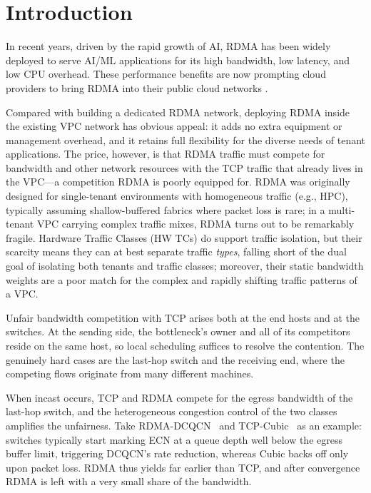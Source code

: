 
\section{Introduction}
\label{sec:intro}

In recent years, driven by the rapid growth of AI, RDMA has been widely
deployed to serve AI/ML applications for its high bandwidth, low latency,
and low CPU overhead. These performance benefits are now prompting cloud
providers to bring RDMA into their public cloud networks
\cite{azure-rdma,alibaba-erdma}.

Compared with building a dedicated RDMA network, deploying RDMA inside
the existing VPC network has obvious appeal: it adds no extra equipment
or management overhead, and it retains full flexibility for the diverse
needs of tenant applications. The price, however, is that RDMA traffic
must compete for bandwidth and other network resources with the TCP
traffic that already lives in the VPC---a competition RDMA is poorly
equipped for. RDMA was originally designed for single-tenant
environments with homogeneous traffic (e.g., HPC), typically assuming
shallow-buffered fabrics where packet loss is rare; in a multi-tenant
VPC carrying complex traffic mixes, RDMA turns out to be remarkably
fragile. Hardware Traffic Classes (HW TCs) do support traffic isolation,
but their scarcity means they can at best separate traffic
\emph{types}, falling short of the dual goal of isolating both tenants
and traffic classes; moreover, their static bandwidth weights are a poor
match for the complex and rapidly shifting traffic patterns of a VPC.

Unfair bandwidth competition with TCP arises both at the end hosts and
at the switches. At the sending side, the bottleneck's owner and all of
its competitors reside on the same host, so local scheduling suffices to
resolve the contention. The genuinely hard cases are the last-hop switch
and the receiving end, where the competing flows originate from many
different machines.

When incast occurs, TCP and RDMA compete for the egress bandwidth of the
last-hop switch, and the heterogeneous congestion control of the two
classes amplifies the unfairness. Take RDMA-DCQCN~\cite{dcqcn} and
TCP-Cubic~\cite{cubic} as an example: switches typically start marking
ECN at a queue depth well below the egress buffer limit, triggering
DCQCN's rate reduction, whereas Cubic backs off only upon packet loss.
RDMA thus yields far earlier than TCP, and after convergence RDMA is
left with a very small share of the bandwidth.

